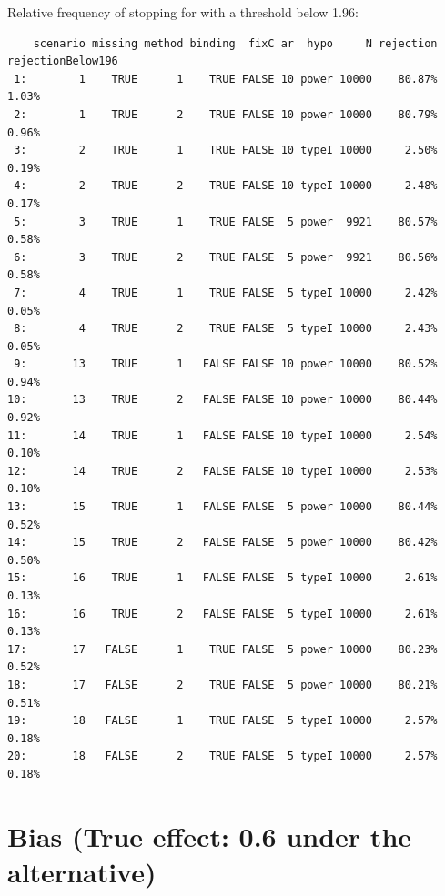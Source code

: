 \documentclass[12pt]{article}
\begin{document}
Relative frequency of stopping for with a threshold below 1.96:
\begin{verbatim}
    scenario missing method binding  fixC ar  hypo     N rejection rejectionBelow196
 1:        1    TRUE      1    TRUE FALSE 10 power 10000    80.87%             1.03%
 2:        1    TRUE      2    TRUE FALSE 10 power 10000    80.79%             0.96%
 3:        2    TRUE      1    TRUE FALSE 10 typeI 10000     2.50%             0.19%
 4:        2    TRUE      2    TRUE FALSE 10 typeI 10000     2.48%             0.17%
 5:        3    TRUE      1    TRUE FALSE  5 power  9921    80.57%             0.58%
 6:        3    TRUE      2    TRUE FALSE  5 power  9921    80.56%             0.58%
 7:        4    TRUE      1    TRUE FALSE  5 typeI 10000     2.42%             0.05%
 8:        4    TRUE      2    TRUE FALSE  5 typeI 10000     2.43%             0.05%
 9:       13    TRUE      1   FALSE FALSE 10 power 10000    80.52%             0.94%
10:       13    TRUE      2   FALSE FALSE 10 power 10000    80.44%             0.92%
11:       14    TRUE      1   FALSE FALSE 10 typeI 10000     2.54%             0.10%
12:       14    TRUE      2   FALSE FALSE 10 typeI 10000     2.53%             0.10%
13:       15    TRUE      1   FALSE FALSE  5 power 10000    80.44%             0.52%
14:       15    TRUE      2   FALSE FALSE  5 power 10000    80.42%             0.50%
15:       16    TRUE      1   FALSE FALSE  5 typeI 10000     2.61%             0.13%
16:       16    TRUE      2   FALSE FALSE  5 typeI 10000     2.61%             0.13%
17:       17   FALSE      1    TRUE FALSE  5 power 10000    80.23%             0.52%
18:       17   FALSE      2    TRUE FALSE  5 power 10000    80.21%             0.51%
19:       18   FALSE      1    TRUE FALSE  5 typeI 10000     2.57%             0.18%
20:       18   FALSE      2    TRUE FALSE  5 typeI 10000     2.57%             0.18%
\end{verbatim}


\clearpage

\section{Bias (True effect: 0.6 under the alternative)}
\label{sec:orgadde8b7}
\end{document}
